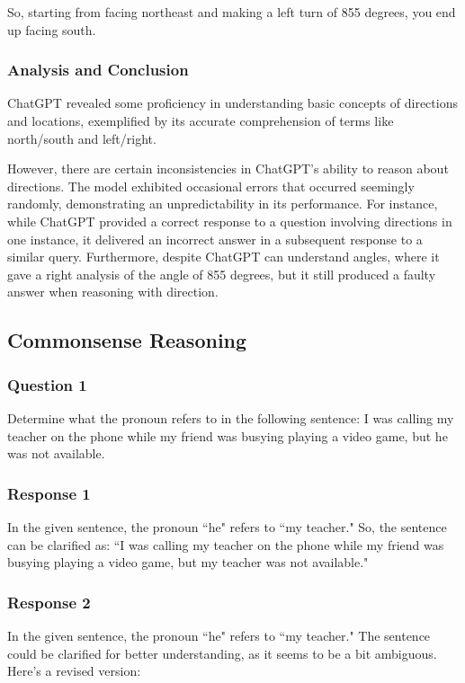 \documentclass[12pt, a4paper]{article}
\begin{document}
So, starting from facing northeast and making a left turn of 855 degrees, you end up facing south.

\subsubsection*{Analysis and Conclusion}
ChatGPT revealed some proficiency in understanding basic concepts of directions and locations, exemplified by its accurate comprehension of terms like north/south and left/right.

However, there are certain inconsistencies in ChatGPT's ability to reason about directions. The model exhibited occasional errors that occurred seemingly randomly, demonstrating an unpredictability in its performance. For instance, while ChatGPT provided a correct response to a question involving directions in one instance, it delivered an incorrect answer in a subsequent response to a similar query. Furthermore, despite ChatGPT can understand angles, where it gave a right analysis of the angle of 855 degrees, but it still produced a faulty answer when reasoning with direction.


\subsection*{Commonsense Reasoning}
\subsubsection*{Question 1}
Determine what the pronoun refers to in the following sentence: I was calling my teacher on the phone while my friend was busying playing a video game, but he was not available.

\subsubsection*{Response 1}
In the given sentence, the pronoun ``he" refers to ``my teacher." So, the sentence can be clarified as: ``I was calling my teacher on the phone while my friend was busying playing a video game, but my teacher was not available."

\subsubsection*{Response 2}
In the given sentence, the pronoun ``he" refers to ``my teacher." The sentence could be clarified for better understanding, as it seems to be a bit ambiguous. Here's a revised version:
\end{document}
